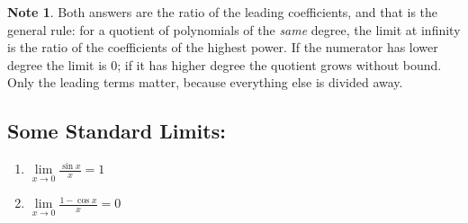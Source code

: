 \documentclass[11pt,a4paper]{article}
\theoremstyle{definition}
\newtheorem{note}[thm]{Note}
\begin{document}
\begin{note}
Both answers are the ratio of the leading coefficients, and that is the general
rule: for a quotient of polynomials of the \emph{same} degree, the limit at
infinity is the ratio of the coefficients of the highest power. If the numerator
has lower degree the limit is $0$; if it has higher degree the quotient grows
without bound. Only the leading terms matter, because everything else is divided
away.
\end{note}
\subsection{Some Standard Limits:}
\begin{enumerate}
\item $\lim\limits_{x\longrightarrow 0} \frac{\sin x}{x}=1$
\item $\lim \limits_{x\longrightarrow 0} \frac{1-\cos x}{x}=0$\\\\
\end{enumerate}
\end{document}
